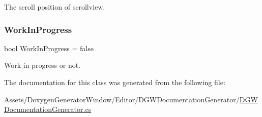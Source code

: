 The scroll position of scrollview. 

\mbox{\label{classDoxygenGeneratorWindow_1_1DGWDocumentationGenerator_a081bcc409dad2dc380fa85c9e1c3235d}} 
\subsubsection{\texorpdfstring{Work\+In\+Progress}{WorkInProgress}}
{\footnotesize\ttfamily bool Work\+In\+Progress = false}



Work in progress or not. 



The documentation for this class was generated from the following file\+:\begin{DoxyCompactItemize}
\item 
Assets/\+Doxygen\+Generator\+Window/\+Editor/\+D\+G\+W\+Documentation\+Generator/\hyperlink{DGWDocumentationGenerator_8cs}{D\+G\+W\+Documentation\+Generator.\+cs}\end{DoxyCompactItemize}
